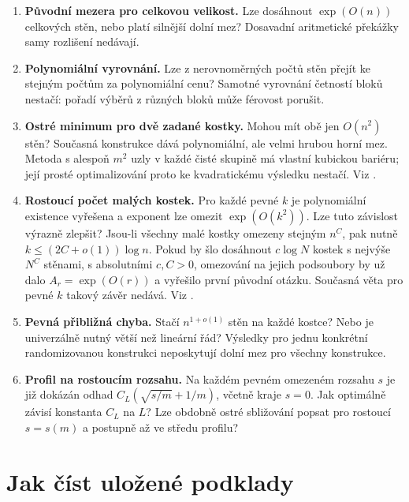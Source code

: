 \documentclass[11pt]{article}
\begin{document}
\begin{enumerate}
\item \textbf{Původní mezera pro celkovou velikost.}
Lze dosáhnout $\exp(O(n))$ celkových stěn, nebo platí silnější
dolní mez? Dosavadní aritmetické překážky samy rozlišení nedávají.

\item \textbf{Polynomiální vyrovnání.}
Lze z nerovnoměrných počtů stěn přejít ke stejným počtům za
polynomiální cenu? Samotné vyrovnání četností bloků nestačí:
pořadí výběrů z různých bloků může férovost porušit.

\item \textbf{Ostré minimum pro dvě zadané kostky.}
Mohou mít obě jen $O(n^2)$ stěn? Současná konstrukce dává
polynomiální, ale velmi hrubou horní mez. Metoda s alespoň $m^2$
uzly v každé čisté skupině má vlastní kubickou bariéru; její prosté
optimalizování proto ke kvadratickému výsledku nestačí.
Viz .

\item \textbf{Rostoucí počet malých kostek.}
Pro každé pevné $k$ je polynomiální existence vyřešena a exponent lze
omezit $\exp(O(k^2))$. Lze tuto závislost výrazně zlepšit?
Jsou-li všechny malé kostky omezeny
stejným $n^C$, pak nutně $k\le(2C+o(1))\log n$.
Pokud by šlo dosáhnout $c\log N$ kostek s nejvýše $N^C$ stěnami,
s absolutními $c,C>0$, omezování na jejich podsoubory by už dalo
$A_r=\exp(O(r))$ a vyřešilo první původní otázku. Současná věta
pro pevné $k$ takový závěr nedává. Viz
.

\item \textbf{Pevná přibližná chyba.}
Stačí $n^{1+o(1)}$ stěn na každé kostce? Nebo je univerzálně nutný
větší než lineární řád? Výsledky pro jednu konkrétní randomizovanou
konstrukci neposkytují dolní mez pro všechny konstrukce.

\item \textbf{Profil na rostoucím rozsahu.}
Na každém pevném omezeném rozsahu $s$ je již dokázán odhad
$C_L(\sqrt{s/m}+1/m)$, včetně kraje $s=0$.
Jak optimálně závisí konstanta $C_L$ na $L$? Lze obdobně ostré
sbližování popsat pro rostoucí $s=s(m)$ a postupně až ve středu profilu?
\end{enumerate}

\section{Jak číst uložené podklady}
\end{document}
